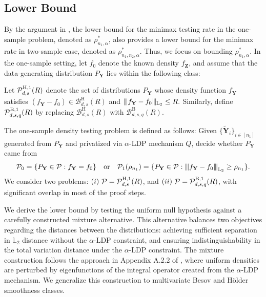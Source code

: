 \documentclass[twoside,11pt]{article}
\newcommand{\distClassGeneric}{\mathcal{P}}
\newcommand{\Ell}{\mathbb{L}}
\newcommand{\EllTwo}{\Ell_2} %
\newcommand{\normEllp}[3]{
	\vertiii{#1}_{\Ell_{#2}}^{#3}
}
\newcommand{\vertiii}[1]{
	{\left\vert\kern-0.25ex\left\vert\kern-0.25ex\left\vert #1 
		\right\vert\kern-0.25ex\right\vert\kern-0.25ex\right\vert}
}%
\newcommand{\rvTwo}{Y}
\newcommand{\rvThree}{Z}
\newcommand{\vectorize}[1]{\mathbf{#1}}
\newcommand{\sampleIndexOne}{i}
\newcommand{\sampleSets}[3]{\{{#1}_{#2}\}_{#2 \in [#3]}}
\newcommand{\dimDensity}{d} %
\newcommand{\sampleSize}{n}
\newcommand{\smoothness}{s}
\newcommand{\privacyMechanism}{Q}
\newcommand{\ballRadius}{R}
\newcommand{\privacyParameter}{\alpha} %
\newcommand{\separation}{\rho} %
\newcommand{\besovParamMicroscope}{q}
\newcommand{\ballDistn}{\mathcal{B}}
\newcommand{\besovBall}[2]{\ballDistn_{\dimDensity,\smoothness, #2}^{\mathrm{B}}(\ballRadius)}
\newcommand{\holderBall}{\ballDistn_{\dimDensity, \smoothness}^{\mathrm{H}}(\ballRadius)} %
\newcommand{\pBesovGof}{ %
	\distClassGeneric_{%
		\dimDensity, \smoothness, \besovParamMicroscope
	}^{%
		\mathrm{B,1}
	}
	(\ballRadius)
}
\newcommand{\pHolderGof}{ %
	\distClassGeneric_{%
		\dimDensity, \smoothness
	}^{%
		\mathrm{H,1}
	}
	(\ballRadius)
}
\begin{document}
\begin{appendix}
	\subsection{Lower Bound}\label{proof:twosample_conti_lower_bound}
	By the argument in \citet{Arias-Castro2018RememberDimension}, the lower bound for the minimax testing rate in the one-sample problem, denoted as $\separation^\ast_{n_1, \privacyParameter}$, also provides a lower bound for the minimax rate in two-sample case, denoted as $\separation^\ast_{n_1, n_2, \privacyParameter}$. 
	Thus, we focus on bounding $\separation^\ast_{n_1, \privacyParameter}$.
	In the one-sample setting,
	let $f_0$ denote the  known density $f_{\vectorize{\rvThree}}$, and assume that the data-generating distribution $P_{\vectorize{Y}}$ lies within the following class:
	\begin{definition}\label{def:smooth_distribution_class_gof}
		Let $\pHolderGof$ denote the set of distributions $P_{\vectorize{Y}}$ whose density function $f_{\vectorize{Y}}$ satisfies $(f_{\vectorize{\rvTwo}} - f_0) \in \holderBall$ and
		$
		\vert\kern-0.25ex \vert\kern-0.25ex \vert f_{\vectorize{\rvTwo}} - f_0 \vert\kern-0.25ex \vert\kern-0.25ex \vert_{\EllTwo} \leq \ballRadius.
		$
		Similarly, define $\pBesovGof$ by replacing $\holderBall$ with $\besovBall{2}{\besovParamMicroscope}$.
	\end{definition}
	\noindent
	The one-sample density testing problem is defined as follows: 
	Given  $\sampleSets{\tilde{\vectorize{\rvTwo}}}{\sampleIndexOne}{\sampleSize_1}$ generated from $P_{\vectorize{Y}}$ and privatized via $\privacyParameter$-LDP mechanism $\privacyMechanism$, decide whether $P_{\vectorize{Y}}$ came from
	\begin{equation}\label{one_sample_hypothesis}
		\distClassGeneric_0 = \{ P_{\vectorize{Y}} \in \distClassGeneric : f_{\vectorize{Y}} = f_0 \}
		\quad \text{or} \quad
		\distClassGeneric_1(\rho_{n_1}) = \{ P_{\vectorize{Y}} \in \distClassGeneric : \normEllp{f_{\vectorize{Y}} - f_0}{2}{} \geq \rho_{n_1} \}.  
	\end{equation}
	We consider two problems: $(i)~\distClassGeneric = \pHolderGof$, and $(ii)~\distClassGeneric = \pBesovGof$, with significant overlap in most of the proof steps.
	
	We derive the lower bound by testing the uniform null hypothesis against a carefully constructed mixture alternative. This alternative balances two objectives regarding the distances between the distributions: achieving sufficient separation in \(\EllTwo\) distance without the \(\privacyParameter\)-LDP constraint, and ensuring indistinguishability in the total variation distance under the \(\privacyParameter\)-LDP constraint.
	The mixture construction follows the approach in Appendix A.2.2 of \citet{Lam-Weil2021MinimaxConstraint}, where uniform densities are perturbed by eigenfunctions of the integral operator created from the $\privacyParameter$-LDP mechanism. We generalize this construction to multivariate Besov and H\"{o}lder smoothness classes.
	

\end{appendix}
\end{document}
